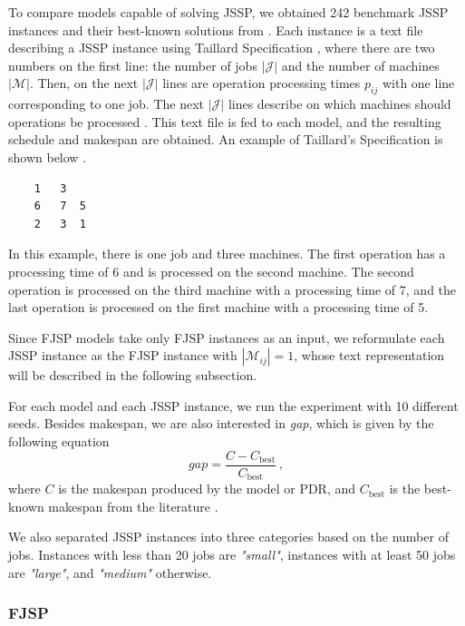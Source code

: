 To compare models capable of solving JSSP, we obtained 242 benchmark JSSP instances and their best-known solutions from \cite{jssp_benchmarks}. Each instance is a text file describing a JSSP instance using Taillard Specification \cite{taillard_specification}, where there are two numbers on the first line: the number of jobs $|\mathcal{J}|$ and the number of machines $|\mathcal{M}|$. Then, on the next $|\mathcal{J}|$ lines are operation processing times $p_{ij}$ with one line corresponding to one job. The next $|\mathcal{J}|$ lines describe on which machines should operations be processed \cite{jssp_benchmarks}. This text file is fed to each model, and the resulting schedule and makespan are obtained.  An example of Taillard's Specification is shown below \cite{jssp_benchmarks}.
\begin{verbatim}
    1   3
    6   7  5
    2   3  1    
\end{verbatim}
In this example, there is one job and three machines. The first operation has a processing time of 6 and is processed on the second machine. The second operation is processed on the third machine with a processing time of 7, and the last operation is processed on the first machine with a processing time of 5.
\par
Since FJSP models take only FJSP instances as an input, we reformulate each JSSP instance as the FJSP instance with $|\mathcal{M}_{ij}| = 1$, whose text representation will be described in the following subsection. 
\par
For each model and each JSSP instance, we run the experiment with 10 different seeds. Besides makespan, we are also interested in \textit{gap}, which is given by the following equation
\begin{equation}
    gap  = \frac{C - C_\text{best}}{C_\text{best}} \, ,
\end{equation}
where $C$ is the makespan produced by the model or PDR, and $C_\text{best}$ is the best-known makespan from the literature \cite{jssp_benchmarks}.
\par
We also separated JSSP instances into three categories based on the number of jobs. Instances with less than 20 jobs are \textit{"small"}, instances with at least 50 jobs are \textit{"large"}, and \textit{"medium"} otherwise.

\subsubsection*{FJSP}

